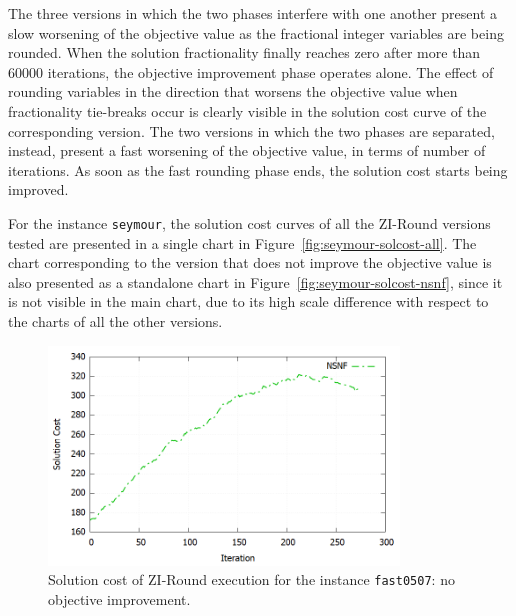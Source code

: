 \documentclass[a4paper,12pt,twoside]{scrbook}
\begin{document}
The three versions in which the two phases interfere with one another present a slow worsening of the objective value as the fractional integer variables are being rounded. When the solution fractionality finally reaches zero after more than $60000$ iterations, the objective improvement phase operates alone. 
The effect of rounding variables in the direction that worsens the objective value when fractionality tie-breaks occur is clearly visible in the solution cost curve of the corresponding version.
The two versions in which the two phases are separated, instead, present a fast worsening of the objective value, in terms of number of iterations. As soon as the fast rounding phase ends, the solution cost starts being improved. \par

For the instance \texttt{seymour}, the solution cost curves of all the ZI-Round versions tested are presented in a single chart in Figure~\ref{fig:seymour-solcost-all}. The chart corresponding to the version that does not improve the objective value is also presented as a standalone chart in Figure~\ref{fig:seymour-solcost-nsnf}, since it is not visible in the main chart, due to its high scale difference with respect to the charts of all the other versions.

\begin{figure}[ht]
	\centering
	\includegraphics[width=0.83\textwidth]{fast0507-solcost-nsnf.png}
	\caption{Solution cost of ZI-Round execution for the instance \texttt{fast0507}: no objective improvement.}
	\label{fig:fast0507-solcost-nsnf}
\end{figure}
\end{document}
